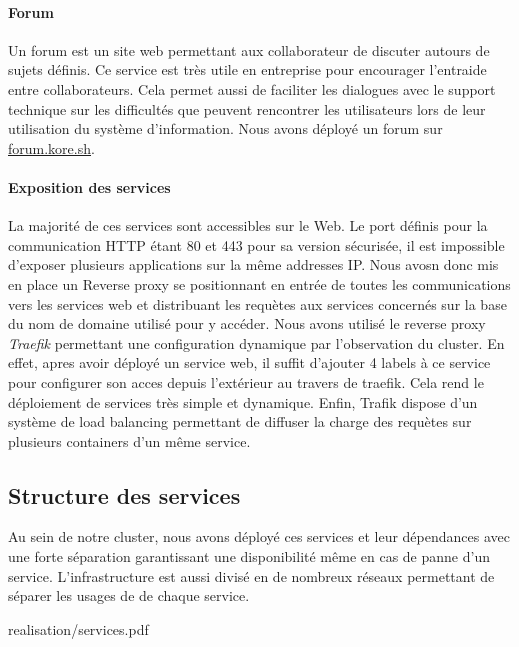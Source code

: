 \paragraph{Forum} Un forum est un site web permettant aux collaborateur de discuter autours de sujets définis.
Ce service est très utile en entreprise pour encourager l'entraide entre collaborateurs.
Cela permet aussi de faciliter les dialogues avec le support technique sur les difficultés que peuvent rencontrer les utilisateurs lors de leur utilisation du système d'information.
Nous avons déployé un forum sur \url{forum.kore.sh}.

\paragraph{Exposition des services} La majorité de ces services sont accessibles sur le Web.
Le port définis pour la communication HTTP étant 80 et 443 pour sa version sécurisée, il est impossible d'exposer plusieurs applications sur la même addresses IP.
Nous avosn donc mis en place un Reverse proxy se positionnant en entrée de toutes les communications vers les services web et distribuant les requètes aux services concernés sur la base du nom de domaine utilisé pour y accéder.
Nous avons utilisé le reverse proxy \emph{Traefik} permettant une configuration dynamique par l'observation du cluster.
En effet, apres avoir déployé un service web, il suffit d'ajouter 4 labels à ce service pour configurer son acces depuis l'extérieur au travers de traefik.
Cela rend le déploiement de services très simple et dynamique.
Enfin, Trafik dispose d'un système de load balancing permettant de diffuser la charge des requètes sur plusieurs containers d'un même service.

\subsection{Structure des services}

Au sein de notre cluster, nous avons déployé ces services et leur dépendances avec une forte séparation garantissant une disponibilité même en cas de panne d'un service.
L'infrastructure est aussi divisé en de nombreux réseaux permettant de séparer les usages de de chaque service.

\begin{figue}{0.94}{realisation/services.pdf}
\end{figue}

\clearpage
